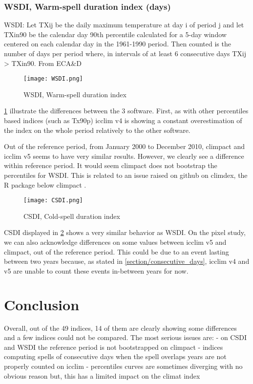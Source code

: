 \documentclass[a4paper,11pt]{article}
\begin{document}
    \section{WSDI, Warm-spell duration index (days)}
        WSDI: Let TXij be the daily maximum temperature at day i of period j and let
        TXin90 be the calendar day 90th percentile calculated for a 5-day window centered on each calendar day in the 1961-1990 period.
        Then counted is the number of days per period where, in intervals of at least 6 consecutive days TXij > TXin90. 
        From ECA\&D\cite{doc/ecad_new}

        \begin{figure}[!hbt]
            \centering
            \texttt{[image: WSDI.png]}
            \caption{WSDI, Warm-spell duration index}
            \label{figure/wsdi}
        \end{figure}
        
        \ref{figure/wsdi} illustrate the differences between the 3 software.
        First, as with other percentiles based indices (such as Tx90p) icclim v4 is showing a constant overestimation of the index on the whole period relatively to the other software.

        Out of the reference period, from January 2000 to December 2010, climpact and icclim v5 seems to have very similar results.
        However, we clearly see a difference within reference period. It would seem climpact does not bootstrap the percentiles for WSDI.
        This is related to an issue raised on github on climdex, the R package below climpact \cite{gh/wsdi_issue}.
    
        \begin{figure}[!hbt]
            \centering
            \texttt{[image: CSDI.png]}
            \caption{CSDI, Cold-spell duration index}
            \label{figure/csdi}
        \end{figure}

        CSDI displayed in \ref{figure/csdi} shows a very similar behavior as WSDI.
        On the pixel study, we can also acknowledge differences on some values between icclim v5 and climpact, out of the reference period.
        This could be due to an event lasting between two years because, as stated in \ref{section/consecutive_days}, icclim v4 and v5 are unable to count these events in-between years for now.
 
    
\part{Conclusion}
    Overall, out of the 49 indices, 14 of them are clearly showing some differences and a few indices could not be compared.
    The most serious issues are:
    - on CSDI and WSDI the reference period is not bootstrapped on climpact
    - indices computing spells of consecutive days when the spell overlaps years are not properly counted on icclim
    - percentiles curves are sometimes diverging with no obvious reason but, this has a limited impact on the climat index
\end{document}
